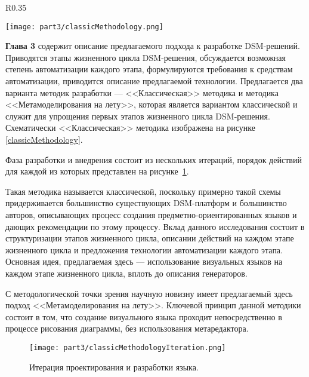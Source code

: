 \begin{wrapfigure}{R}{0.35\textwidth}
	\begin{center}
		\texttt{[image: part3/classicMethodology.png]}
		\caption{<<Классическая>> методика разработки.}
		\label{classicMethodology}
	\end{center}
\end{wrapfigure}

\textbf{Глава 3} содержит описание предлагаемого подхода к разработке 
DSM-решений. Приводятся этапы жизненного цикла DSM-решения, обсуждается 
возможная степень автоматизации каждого этапа, формулируются требования к 
средствам автоматизации, приводится описание предлагаемой технологии. Предлагается
два варианта методик разработки --- <<Классическая>> методика и методика <<Метамоделирования
на лету>>, которая является вариантом классической и служит для упрощения первых этапов
жизненного цикла DSM-решения. Схематически <<Классическая>> методика изображена на рисунке
\ref{classicMethodology}.

Фаза разработки и внедрения состоит из нескольких итераций, порядок действий для каждой 
из которых представлен на рисунке~\ref{classicMethodologyIteration}. 

Такая методика называется классической, поскольку примерно такой схемы придерживается
большинство существующих DSM-платформ и большинство авторов, описывающих процесс создания
предметно-ориентированных языков и дающих рекомендации по этому процессу. Вклад данного 
исследования состоит в структуризации этапов жизненного цикла, описании действий на 
каждом этапе жизненного цикла и предложения технологии автоматизации каждого этапа.
Основная идея, предлагаемая здесь --- использование визуальных языков на каждом
этапе жизненного цикла, вплоть до описания генераторов.

С методологической точки зрения научную новизну имеет предлагаемый здесь подход 
<<Метамоделирования на лету>>. Ключевой принцип данной методики состоит в том, 
что создание визуального языка проходит непосредственно в процессе рисования диаграммы, 
без использования метаредактора.

\begin{figure} [ht]
	\begin{center}
		\texttt{[image: part3/classicMethodologyIteration.png]}
		\caption{Итерация проектирования и разработки языка.}
		\label{classicMethodologyIteration}
	\end{center}
\end{figure}

